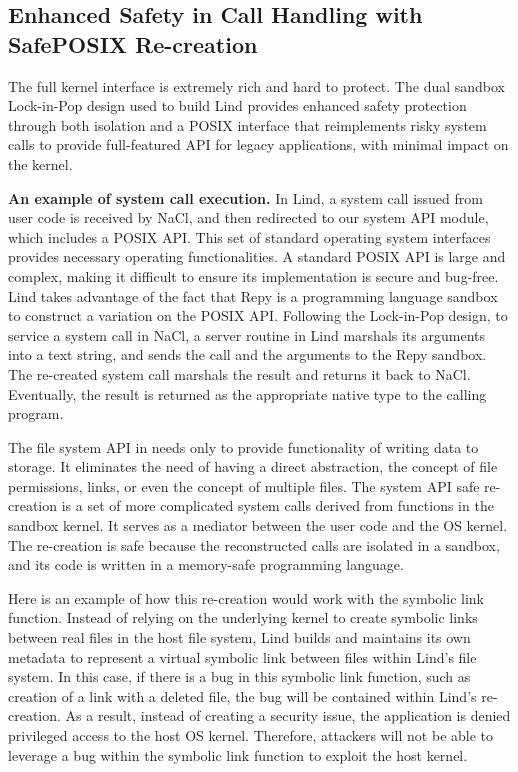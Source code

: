 \subsection{Enhanced Safety in Call Handling with SafePOSIX Re-creation}

The full kernel interface is extremely rich and hard to protect.
The dual sandbox Lock-in-Pop design used to build Lind provides enhanced
safety protection through both isolation and a POSIX interface that
reimplements risky system calls to
provide full-featured API for legacy applications, with minimal impact on the kernel.

\textbf{An example of system call execution.}
In Lind, a system call issued from user code is
received by NaCl, and then redirected to our system API module, which
includes a POSIX API. This set of standard
operating system interfaces provides
necessary operating functionalities. A standard POSIX API is large and complex,
making it difficult to ensure its implementation is secure and bug-free.
Lind takes advantage of the fact that Repy is a programming language sandbox to
construct a variation on the POSIX API. Following the
Lock-in-Pop design, to service a system call in NaCl, a server routine in
Lind marshals its arguments into a text string, and sends the call and the arguments
to the Repy sandbox. The re-created system call marshals the result and
returns it back to NaCl. Eventually, the result is returned as the appropriate
native type to the calling program.

The file system API in \lip needs only
to provide functionality of writing data to storage.
It eliminates the need of having a direct abstraction, the
concept of file permissions, links, or even the concept of multiple files.
The system API safe re-creation is a set of more complicated system calls
derived from functions in the sandbox kernel.
It serves as a mediator between the user code
and the OS kernel. The re-creation is safe
because the reconstructed calls are isolated in a sandbox, and its code is written 
in a memory-safe programming language.

Here is an example of how this re-creation would work with the symbolic link function. 
Instead of relying on the underlying kernel to create symbolic links between real files 
in the host file system, Lind builds and maintains its own metadata to represent a virtual symbolic link 
between files within Lind's file system. In this case, if there is a bug in this symbolic link function, 
such as creation of a link with a deleted file, the bug will be contained within Lind's re-creation. 
As a result, instead of creating a security issue, the application is denied privileged access
to the host OS kernel. 
Therefore, attackers will not be able to leverage a bug within the symbolic link function to 
exploit the host kernel.  


